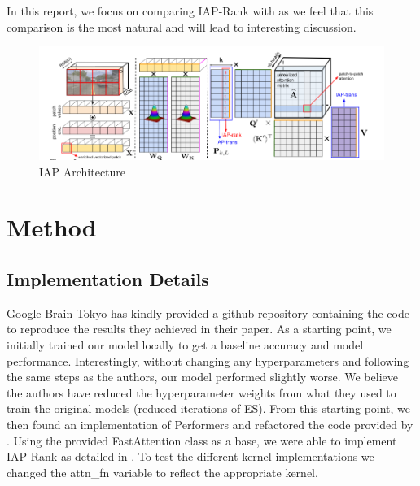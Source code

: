 \documentclass[10pt,twocolumn,letterpaper]{article}
\begin{document}
In this report, we focus on comparing IAP-Rank with 
\cite{Tang} as we feel that this comparison is the most natural and will lead to 
interesting discussion.

\begin{figure}[h]
    \includegraphics[scale=0.26]{images/iap.png}
    \caption{IAP Architecture \cite{choromanski}}
\end{figure}


\section{Method}

\subsection{Implementation Details}
Google Brain Tokyo has kindly provided a github repository containing the code 
to reproduce the results they achieved in their paper\cite{Tang}. As a starting
point, we initially trained our model locally to get a
baseline accuracy and model performance. Interestingly, without changing any
hyperparameters and following the same steps as the authors, our model performed
slightly worse. We believe the authors have reduced the 
hyperparameter weights from what they used to train the original models (reduced iterations of ES).
From this starting point, we then found an implementation of Performers 
\cite{Performers} and refactored the code provided by \cite{lucidrains}. Using
the provided FastAttention class as a base, we were able to implement
IAP-Rank as detailed in \cite{choromanski}. To test the different kernel implementations
we changed the attn\_fn variable to reflect the appropriate kernel.
\end{document}
